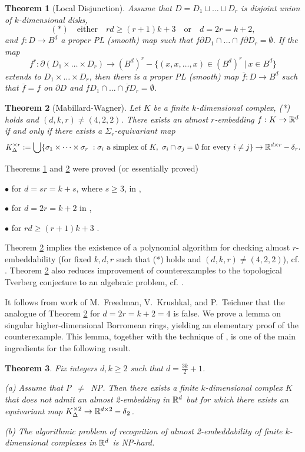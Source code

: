 \documentclass[12pt]{article}
\def\diag{\delta}
\theoremstyle{plain}
\newtheorem{Theorem}{Theorem}[section]
\theoremstyle{definition}
\begin{document}
\begin{Theorem}[Local Disjunction]\label{l:ldm} Assume that $D=D_1\sqcup\ldots\sqcup D_r$ is disjoint union of $k$-dimensional disks,
$$(*)\quad\text{either}\quad rd\ge(r+1)k+3\quad\text{or}\quad d=2r=k+2,$$
and $f:D\to B^d$ a proper PL (smooth) map such that $f\partial D_1\cap\ldots\cap f\partial D_r=\emptyset$.
If the map
$$f^r:\partial(D_1\times\ldots\times D_r)\to (B^d)^r-\{(x,x,\ldots,x)\in(B^d)^r\ |\ x\in B^d\}$$
extends to $D_1\times\ldots\times D_r$, then there is a proper PL (smooth) map $\overline f:D\to B^d$ such that
$\overline f=f$ on $\partial D$ and $\overline fD_1\cap\ldots\cap \overline fD_r=\emptyset$.
\end{Theorem}

\begin{Theorem}[Mabillard-Wagner]\label{t:mmw}
Let $K$ be a finite $k$-dimensional complex, (*) holds and $(d,k,r)\ne(4,2,2)$.
There exists an almost $r$-embedding $f:K\to{\mathbb R}^d$ if and only if there exists a $\Sigma_r$-equivariant map
$$K^{\times r}_{\Delta}:= \bigcup \{ \sigma_1\times\cdots\times\sigma_r
\ : \sigma_i \textrm{ a simplex of }K,\ \sigma_i \cap \sigma_j = \emptyset \mbox{ for every $i \neq j$} \}
\to \R^{d\times r}-\diag\phantom{}_r.$$
\end{Theorem}

Theorems \ref{l:ldm} and \ref{t:mmw} were proved (or essentially proved)

$\bullet$ for $d=sr=k+s$, where $s\ge3$, in \cite{MW15},

$\bullet$ for $d=2r=k+2$ in \cite{AMSW},

$\bullet$ for $rd\ge(r+1)k+3$ \cite{MW16, Sk17}.

Theorem \ref{t:mmw} implies the existence of a polynomial algorithm for checking almost $r$-embeddability
(for fixed $k,d,r$ such that (*) holds and $(d,k,r)\ne(4,2,2)$), cf. \cite[Corollary 5]{MW15}.
Theorem \ref{t:mmw} also reduces improvement of counterexamples to the topological Tverberg conjecture to an algebraic problem, cf. \cite[paragraph before Theorem 1.6]{Sk16}.

It follows from work of M.\ Freedman, V.\ Krushkal, and P.\ Teichner that the analogue of Theorem \ref{t:mmw} for $d=2r=k+2=4$ is false.
We prove a lemma on singular higher-dimensional Borromean rings, yielding an elementary
proof of the counterexample.
This lemma, together with the technique of \cite{MTW08}, is one of the main ingredients for the following result.

\begin{Theorem} \cite{ST17} Fix integers $d,k\ge2$ such that $d=\frac{3k}2+1$.

(a) Assume that P~$\ne$~NP.
Then there exists a finite $k$-dimensional complex $K$ that does not admit an
almost 2-embedding in ${\mathbb R}^d$ but for which there exists an equivariant map
$K^{\times 2}_{\Delta}\to\R^{d\times 2}-\diag\phantom{}_2$.

(b) The algorithmic problem of recognition of almost 2-embeddability of
finite $k$-dimensional complexes in ${\mathbb R}^d$ is NP-hard.
\end{Theorem}
\end{document}
